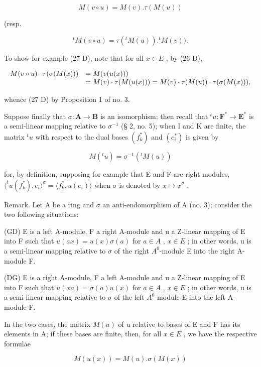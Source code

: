 \[
M (v \circ u) = M (v). \tau (M (u))\tag{27 D}
\]

(resp.

\[
{ } ^ { t } M ( v \circ u ) = \tau ( { } ^ { t } M ( u ) ) . { } ^ { t } M ( v ) ) .\tag{27 G}
\]

To show for example (27 D), note that for all \(x \in E\) , by (26 D),

\[
\begin{array}{r l} M (v \circ u) \cdot \tau (\sigma (M (x))) & = M (v (u (x))) \\ & = M (v) \cdot \tau (M (u (x))) = M (v) \cdot \tau (M (u)) \cdot \tau (\sigma (M (x))), \end{array}
\]

whence (27 D) by Proposition 1 of no. 3.

Suppose finally that \(\sigma: \mathbf{A} \to \mathbf{B}\) is an isomorphism; then recall that \(^t u: \mathbf{F}^* \to \mathbf{E}^*\) is a semi-linear mapping relative to \(\sigma^{-1}\) (§ 2, no. 5); when I and K are finite, the matrix \(^t u\) with respect to the dual bases \((f_k^*)\) and \((e_i^*)\) is given by

\[
M (^ {t} u) = \sigma^ {- 1} (^ {t} M (u))\tag{28}
\]

for, by definition, supposing for example that E and F are right modules, \(\langle^t u(f_k^*), e_i \rangle^\sigma = \langle f_k^*, u(e_i) \rangle\) when \(\sigma\) is denoted by \(x \mapsto x^\sigma\) .

Remark. Let A be a ring and \(\sigma\) an anti-endomorphism of A (no. 3); consider the two following situations:

(GD) E is a left A-module, F a right A-module and u a Z-linear mapping of E into F such that \(u(ax) = u(x)\sigma(a)\) for \(a \in A\) , \(x \in E\) ; in other words, u is a semi-linear mapping relative to \(\sigma\) of the right \(A^{0}\)-module E into the right A-module F.

(DG) E is a right A-module, F a left A-module and u a Z-linear mapping of E into F such that \(u(xa) = \sigma(a)u(x)\) for \(a \in A\) , \(x \in E\) ; in other words, u is a semi-linear mapping relative to \(\sigma\) of the left \(A^{0}\)-module E into the left A-module F.

In the two cases, the matrix \(M(u)\) of u relative to bases of E and F has its elements in A; if these bases are finite, then, for all \(x \in E\) , we have the respective formulae

\[
M (u (x)) = M (u). \sigma (M (x))\tag{17 GD}
\]

